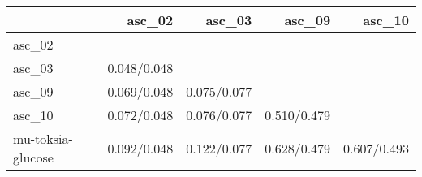 \begin{tabular}{lrrrr}
\toprule
 & asc_02 & asc_03 & asc_09 & asc_10 \\
\midrule
asc_02 &  &  &  &  \\
asc_03 & 0.048/0.048 &  &  &  \\
asc_09 & 0.069/0.048 & 0.075/0.077 &  &  \\
asc_10 & 0.072/0.048 & 0.076/0.077 & 0.510/0.479 &  \\
mu-toksia-glucose & 0.092/0.048 & 0.122/0.077 & 0.628/0.479 & 0.607/0.493 \\
\bottomrule
\end{tabular}
